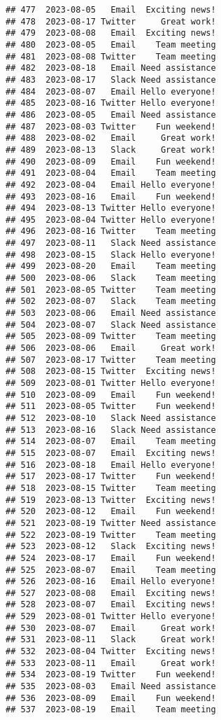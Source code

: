\documentclass[
]{article}
\begin{document}
\begin{verbatim}
## 477  2023-08-05   Email  Exciting news!
## 478  2023-08-17 Twitter     Great work!
## 479  2023-08-08   Email  Exciting news!
## 480  2023-08-05   Email    Team meeting
## 481  2023-08-08 Twitter    Team meeting
## 482  2023-08-18   Email Need assistance
## 483  2023-08-17   Slack Need assistance
## 484  2023-08-07   Email Hello everyone!
## 485  2023-08-16 Twitter Hello everyone!
## 486  2023-08-05   Email Need assistance
## 487  2023-08-03 Twitter    Fun weekend!
## 488  2023-08-02   Email     Great work!
## 489  2023-08-13   Slack     Great work!
## 490  2023-08-09   Email    Fun weekend!
## 491  2023-08-04   Email    Team meeting
## 492  2023-08-04   Email Hello everyone!
## 493  2023-08-16   Email    Fun weekend!
## 494  2023-08-13 Twitter Hello everyone!
## 495  2023-08-04 Twitter Hello everyone!
## 496  2023-08-16 Twitter    Team meeting
## 497  2023-08-11   Slack Need assistance
## 498  2023-08-15   Slack Hello everyone!
## 499  2023-08-20   Email    Team meeting
## 500  2023-08-06   Slack    Team meeting
## 501  2023-08-05 Twitter    Team meeting
## 502  2023-08-07   Slack    Team meeting
## 503  2023-08-06   Email Need assistance
## 504  2023-08-07   Slack Need assistance
## 505  2023-08-09 Twitter    Team meeting
## 506  2023-08-06   Email     Great work!
## 507  2023-08-17 Twitter    Team meeting
## 508  2023-08-15 Twitter  Exciting news!
## 509  2023-08-01 Twitter Hello everyone!
## 510  2023-08-09   Email    Fun weekend!
## 511  2023-08-05 Twitter    Fun weekend!
## 512  2023-08-10   Slack Need assistance
## 513  2023-08-16   Slack Need assistance
## 514  2023-08-07   Email    Team meeting
## 515  2023-08-07   Email  Exciting news!
## 516  2023-08-18   Email Hello everyone!
## 517  2023-08-17 Twitter    Fun weekend!
## 518  2023-08-15 Twitter    Team meeting
## 519  2023-08-13 Twitter  Exciting news!
## 520  2023-08-12   Email    Fun weekend!
## 521  2023-08-19 Twitter Need assistance
## 522  2023-08-19 Twitter    Team meeting
## 523  2023-08-12   Slack  Exciting news!
## 524  2023-08-17   Email    Fun weekend!
## 525  2023-08-07   Email    Team meeting
## 526  2023-08-16   Email Hello everyone!
## 527  2023-08-08   Email  Exciting news!
## 528  2023-08-07   Email  Exciting news!
## 529  2023-08-01 Twitter Hello everyone!
## 530  2023-08-07   Email     Great work!
## 531  2023-08-11   Slack     Great work!
## 532  2023-08-04 Twitter  Exciting news!
## 533  2023-08-11   Email     Great work!
## 534  2023-08-19 Twitter    Fun weekend!
## 535  2023-08-03   Email Need assistance
## 536  2023-08-09   Email    Fun weekend!
## 537  2023-08-19   Email    Team meeting

\end{verbatim}
\end{document}
